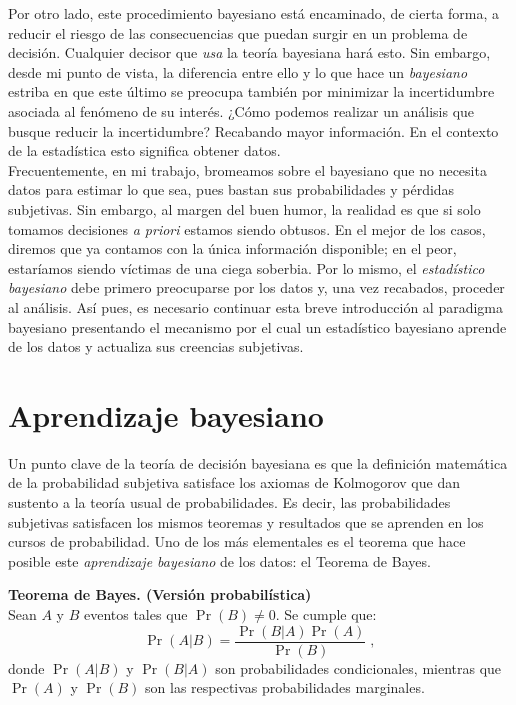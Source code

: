 Por otro lado, este procedimiento bayesiano está encaminado, de cierta forma, a reducir el riesgo de las consecuencias que puedan surgir en un problema de decisión. Cualquier decisor que \textit{usa} la teoría bayesiana hará esto. Sin embargo, desde mi punto de vista, la diferencia entre ello y lo que hace un \textit{bayesiano} estriba en que este último se preocupa también por minimizar la incertidumbre asociada al fenómeno de su interés. ¿Cómo podemos realizar un análisis que busque reducir la incertidumbre? Recabando mayor información. En el contexto de la estadística esto significa obtener datos.\\ 

Frecuentemente, en mi trabajo, bromeamos sobre el bayesiano que no necesita datos para estimar lo que sea, pues bastan sus probabilidades y pérdidas subjetivas. Sin embargo, al margen del buen humor, la realidad es que si solo tomamos decisiones \textit{a priori} estamos siendo obtusos. En el mejor de los casos, diremos que ya contamos con la única información disponible; en el peor, estaríamos siendo víctimas de una ciega soberbia. Por lo mismo, el \textit{estadístico bayesiano} debe primero preocuparse por los datos y, una vez recabados, proceder al análisis. Así pues, es necesario continuar esta breve introducción al paradigma bayesiano presentando el mecanismo por el cual un estadístico bayesiano aprende de los datos y actualiza sus creencias subjetivas.
	
\section{Aprendizaje bayesiano}

Un punto clave de la teoría de decisión bayesiana es que la definición matemática de la probabilidad subjetiva satisface los axiomas de Kolmogorov que dan sustento a la teoría usual de probabilidades. Es decir, las probabilidades subjetivas satisfacen los mismos teoremas y resultados que se aprenden en los cursos de probabilidad. Uno de los más elementales es el teorema que hace posible este \textit{aprendizaje bayesiano} de los datos: el Teorema de Bayes.

\begin{teo} \label{teo:Bayes_1}
\textbf{Teorema de Bayes. (Versión probabilística)}\\
Sean $A$ y $B$ eventos tales que $\Pr(B) \neq 0$. Se cumple que: 
\begin{equation*}
\Pr(A|B)=\dfrac{\Pr(B|A)\Pr(A)}{\Pr(B)}\;,
\end{equation*}
donde $\Pr(A|B)$ y $\Pr(B|A)$ son probabilidades condicionales, mientras que $\Pr(A)$ y $\Pr(B)$ son las respectivas probabilidades marginales. 
\end{teo}

